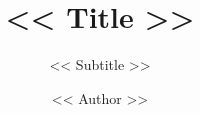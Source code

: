 \documentclass[a4paper, 12pt]{scrartcl}
\title{<< Title >>}
\subtitle{<< Subtitle >>}
\author{<< Author >>}
\begin{document}
\maketitle
\tableofcontents
\listoffigures
\pagebreak
\end{document}
